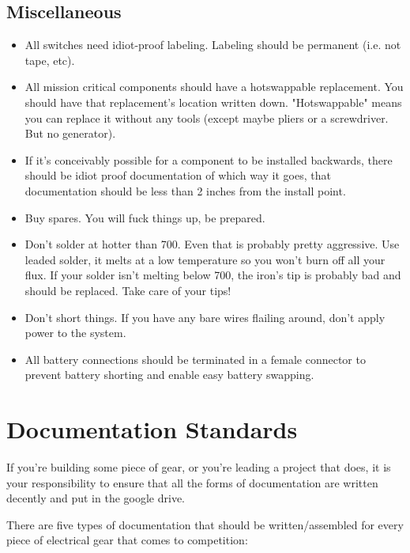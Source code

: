 \documentclass{article}
\begin{document}
\subsection{Miscellaneous}
\begin{itemize}
\item All switches need idiot-proof labeling. Labeling should be permanent (i.e. not tape, etc).
\item All mission critical components should have a hotswappable replacement. You should have that replacement's location written down. "Hotswappable" means you can replace it without any tools (except maybe pliers or a screwdriver. But no generator).
\item If it's conceivably possible for a component to be installed backwards, there should be idiot proof documentation of which way it goes, that documentation should be less than 2 inches from the install point.
\item Buy spares. You will fuck things up, be prepared.
\item Don't solder at hotter than 700\degree. Even that is probably pretty aggressive. Use leaded solder, it melts at a low temperature so you won't burn off all your flux. If your solder isn't melting below 700\degree, the iron's tip is probably bad and should be replaced. Take care of your tips!
\item Don't short things. If you have any bare wires flailing around, don't apply power to the system.
\item All battery connections should be terminated in a female connector to prevent battery shorting and enable easy battery swapping.
\end{itemize}

\section{Documentation Standards}
If you're building some piece of gear, or you're leading a project that does, it is your responsibility to ensure that all the forms of documentation are written decently and put in the google drive.

There are five types of documentation that should be written/assembled for every piece of electrical gear that comes to competition:
\end{document}
